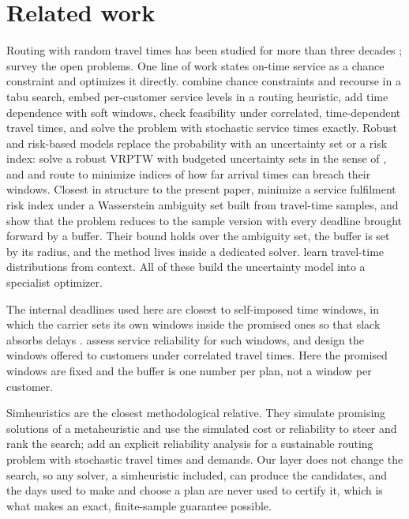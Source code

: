 \documentclass[11pt,a4paper]{article}
\theoremstyle{remark}
\begin{document}
\section{Related work}\label{sec:related}

Routing with random travel times has been studied for more than three decades
\citep{laporte1992,gendreau1996,kenyon2003}; \citet{gendreau2016} survey the open
problems. One line of work states on-time service as a chance constraint and
optimizes it directly. \citet{li2010} combine chance constraints and recourse in a tabu search,
\citet{ehmke2015} embed per-customer service levels in a routing heuristic,
\citet{tas2014} add time dependence with soft windows, \citet{bomboi2022} check
feasibility under correlated, time-dependent travel times, and \citet{errico2018}
solve the problem with stochastic service times exactly.
Robust and risk-based models replace the probability with an uncertainty set or a
risk index: \citet{agra2013} solve a robust VRPTW with budgeted uncertainty sets in
the sense of \citet{bertsimas2004}, and \citet{jaillet2016} and \citet{zhang2019}
route to minimize indices of how far arrival times can breach their windows.
Closest in structure to the present paper, \citet{zhang2021} minimize a service
fulfilment risk index under a Wasserstein ambiguity set built from travel-time
samples, and show that the problem reduces to the sample version with every
deadline brought forward by a buffer. Their bound holds over the ambiguity set,
the buffer is set by its radius, and the method lives inside a dedicated solver.
\citet{serrano2026} learn travel-time distributions from context. All of these
build the uncertainty model into a specialist optimizer.

The internal deadlines used here are closest to self-imposed time windows, in
which the carrier sets its own windows inside the promised ones so that slack
absorbs delays \citep{jabali2015}. \citet{vareias2019} assess service reliability for such
windows, and \citet{hosseini2025} design the windows offered to customers under
correlated travel times. Here the promised windows are fixed and the buffer is one
number per plan, not a window per customer.

Simheuristics \citep{juan2015} are the closest methodological relative. They simulate promising
solutions of a metaheuristic and use the simulated cost or reliability to steer and
rank the search;
\citet{abdullahi2025} add an explicit reliability analysis for a sustainable
routing problem with stochastic travel times and demands. Our layer does not change the
search, so any solver, a simheuristic included, can produce the candidates, and the days
used to make and choose a plan are never used to certify it, which is what makes an
exact, finite-sample guarantee possible.
\end{document}
